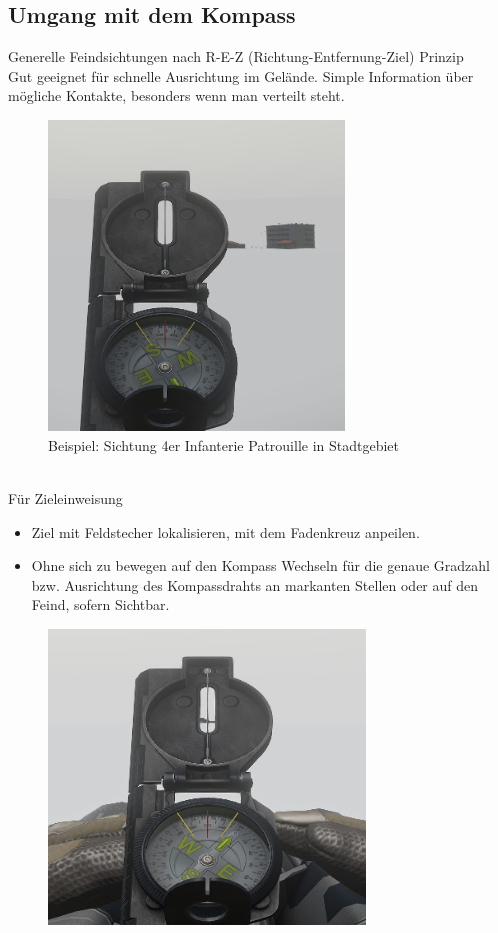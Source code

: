 \subsection{Umgang mit dem Kompass}
Generelle Feindsichtungen nach R-E-Z (Richtung-Entfernung-Ziel) Prinzip \\

Gut geeignet für schnelle Ausrichtung im Gelände. Simple Information über mögliche Kontakte, besonders wenn man verteilt steht.
\begin{figure}[!h]
	\centering
	\includegraphics[width=0.7\textwidth]{../img/advanced/kartenarbeit/Kompass1.jpg}
	\caption{Beispiel: Sichtung 4er Infanterie Patrouille in Stadtgebiet}
\end{figure}\\
	
Für Zieleinweisung
\begin{itemize}
	\item Ziel mit Feldstecher lokalisieren, mit dem Fadenkreuz anpeilen.
	\item Ohne sich zu bewegen auf den Kompass Wechseln für die genaue Gradzahl bzw. Ausrichtung des Kompassdrahts an markanten Stellen oder auf den Feind, sofern Sichtbar.
\end{itemize}

\begin{figure}[!h]
	\centering
	\includegraphics[width=0.75\textwidth]{../img/advanced/kartenarbeit/Kompass2.jpg}
\end{figure}


